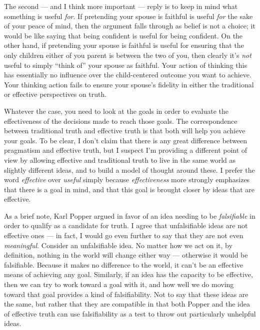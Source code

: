 \documentclass[20pt,]{extarticle}
\begin{document}
The second --- and I think more important --- reply is to keep in mind
what something is useful \emph{for}. If pretending your spouse is
faithful is useful \emph{for} the sake of your peace of mind, then the
argument falls through as belief is not a choice; it would be like
saying that being confident is useful for being confident. On the other
hand, if pretending your spouse is faithful is useful for ensuring that
the only children either of you parent is between the two of you, then
clearly it's \emph{not} useful to simply ``think of'' your spouse as
faithful. Your action of thinking this has essentially no influence over
the child-centered outcome you want to achieve. Your thinking action
fails to ensure your spouse's fidelity in either the traditional or
effective perspectives on truth.

Whatever the case, you need to look at the goals in order to evaluate
the effectiveness of the decisions made to reach those goals. The
correspondence between traditional truth and effective truth is that
both will help you achieve your goals. To be clear, I don't claim that
there is any great difference between pragmatism and effective truth,
but I suspect I'm providing a different point of view by allowing
effective and traditional truth to live in the same world as slightly
different ideas, and to build a model of thought around these. I prefer
the word \emph{effective} over \emph{useful} simply because
\emph{effectiveness} more strongly emphasizes that there is a goal in
mind, and that this goal is brought closer by ideas that are effective.

As a brief note, Karl Popper argued in favor of an idea needing to be
\emph{falsifiable} in order to qualify as a candidate for truth. I agree
that unfalsifiable ideas are not effective ones --- in fact, I would go
even further to say that they are not even \emph{meaningful}. Consider
an unfalsifiable idea. No matter how we act on it, by definition,
nothing in the world will change either way --- otherwise it would be
falsifiable. Because it makes no difference to the world, it can't be an
effective means of achieving any goal. Similarly, if an idea has the
capacity to be effective, then we can try to work toward a goal with it,
and how well we do moving toward that goal provides a kind of
falsifiability. Not to say that these ideas are the same, but rather
that they are compatible in that both Popper and the idea of effective
truth can use falsifiability as a test to throw out particularly
unhelpful ideas.
\end{document}
